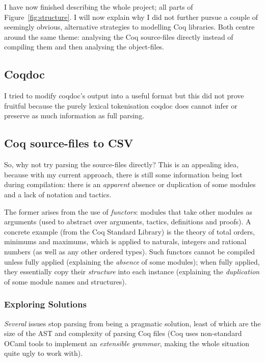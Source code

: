I have now finished describing the whole project; all parts of
Figure~\ref{fig:structure}. I will now explain why I did not further pursue a
couple of seemingly obvious, alternative strategies to modelling Coq libraries.
Both centre around the same theme: analysing the Coq source-files directly
instead of compiling them and then analysing the object-files.


\subsection{Coqdoc}

I tried to modify coqdoc's output into a useful format but this did not prove
fruitful because the purely lexical tokenisation coqdoc does cannot infer or
preserve as much information as full parsing.

\subsection{Coq source-files to CSV}

So, why not try parsing the source-files directly? This is an appealing idea,
because with my current approach, there is still some information being lost
during compilation: there is an \emph{apparent} absence or duplication of some
modules and a lack of notation and tactics.

The former arises from the use of \emph{functors}: modules that take other
modules as arguments (used to abstract over arguments, tactics, definitions and
proofs). A concrete example (from the Coq Standard Library) is the theory of
total orders, minimums and maximums, which is applied to naturals, integers and
rational numbers (as well as any other ordered types). Such functors cannot be
compiled unless fully applied (explaining the \emph{absence} of some modules);
when fully applied, they essentially copy their \emph{structure} into each
instance (explaining the \emph{duplication} of some module names and
structures).

\subsubsection{Exploring Solutions}

\emph{Several} issues stop parsing from being a pragmatic solution, least of
which are the size of the AST and complexity of parsing Coq files (Coq uses
non-standard OCaml tools to implement an \emph{extensible grammar}, making the
whole situation quite ugly to work with).

